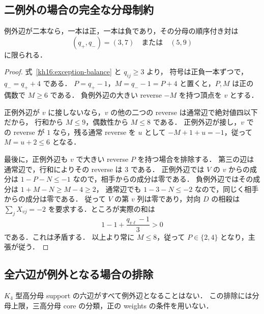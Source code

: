 \subsection{二例外の場合の完全な分母制約}

\begin{proposition}[二本の例外辺の分母]
\label{kh16:two-exceptions}
例外辺が二本なら，一本は正，一本は負であり，その分母の順序付き対は
\begin{equation}\label{kh16:two-exception-pairs}
 (q_+,q_-)=(3,7)\quad\text{または}\quad(5,9)
\end{equation}
に限られる．
\end{proposition}

\begin{proof}
式~\eqref{kh16:exception-balance} と $q_{ij}\geq3$ より，
符号は正負一本ずつで，$q_-=q_++4$ である．
$P=q_+-1$，$M=q_--1=P+4$ と置くと，$P,M$ は正の偶数で $M\geq6$ である．
負例外辺の大きい reverse $-M$ を持つ頂点を $v$ とする．

正例外辺が $v$ に接しないなら，$v$ の他の二つの reverse は通常辺で絶対値四以下だから，
行和から $M\leq9$，偶数性から $M\leq8$ である．
正例外辺が接し，$v$ での reverse が $1$ なら，残る通常 reverse を $u$ として
$-M+1+u=-1$，従って $M=u+2\leq6$ となる．

最後に，正例外辺も $v$ で大きい reverse $P$ を持つ場合を排除する．
第三の辺は通常辺で，行和によりその reverse は $3$ である．
正例外辺では $V$ の $v$ からの成分は $1-P-N\leq-1$ なので，相手からの成分は零である．
負例外辺ではその成分は $1+M-N\geq M-4\geq2$，
通常辺でも $1-3-N\leq-2$ なので，同じく相手からの成分は零である．
従って $V$ の第 $v$ 列は零であり，対向 $D$ の相殺は
$\sum_j X_{vj}=-2$ を要求する．ところが実際の和は
\[
 1-1+\frac{q_{v\ell}-1}{3}>0
\]
である．これは矛盾する．
以上より常に $M\leq8$，従って $P\in\{2,4\}$ となり，主張が従う．
\end{proof}

\subsection{全六辺が例外となる場合の排除}

\begin{theorem}
\label{kh16:not-all-exceptional}
$K_4$ 型高分母 support の六辺がすべて例外辺となることはない．
この排除には分母上限，三高分母 core の分類，正の weights の条件を用いない．
\end{theorem}

